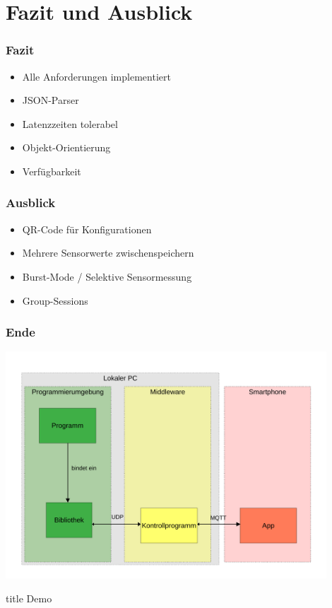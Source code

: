 \documentclass{beamer}
\begin{document}
\section{Fazit und Ausblick}
\begin{frame}
    \frametitle[]{Fazit}
    \begin{itemize}
        \item Alle Anforderungen implementiert
        \item JSON-Parser
        \item Latenzzeiten tolerabel
        \item Objekt-Orientierung
        \item Verfügbarkeit
    \end{itemize}
\end{frame}
\begin{frame}
    \frametitle[]{Ausblick}
    \begin{itemize}
        \item QR-Code für Konfigurationen
        \item Mehrere Sensorwerte zwischenspeichern
        \item Burst-Mode / Selektive Sensormessung
        \item Group-Sessions
    \end{itemize}
\end{frame}

\begin{frame}
    \frametitle{Ende}
    \vfill
    \centering
    \includegraphics[width=0.9\textwidth]{images/framework.pdf}
\end{frame}

\begin{frame}
    \vfill
    \centering
    \begin{beamercolorbox}[sep=8pt,center,shadow=true,rounded=true]{title}
      Demo
    \end{beamercolorbox}
    \vfill
    \end{frame}
\end{document}
